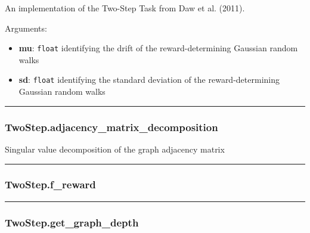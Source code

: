 An implementation of the Two-Step Task from Daw et al. (2011).

Arguments:

\begin{itemize}
\tightlist
\item
  \textbf{mu}: \texttt{float} identifying the drift of the
  reward-determining Gaussian random walks
\item
  \textbf{sd}: \texttt{float} identifying the standard deviation of the
  reward-determining Gaussian random walks
\end{itemize}

\begin{center}\rule{0.5\linewidth}{\linethickness}\end{center}

\subsubsection{TwoStep.adjacency\_matrix\_decomposition}\label{twostep.adjacency_matrix_decomposition}

\begin{Shaded}
\begin{Highlighting}[]
\NormalTok{)}
\end{Highlighting}
\end{Shaded}

Singular value decomposition of the graph adjacency matrix

\begin{center}\rule{0.5\linewidth}{\linethickness}\end{center}

\subsubsection{TwoStep.f\_reward}\label{twostep.f_reward}

\begin{Shaded}
\begin{Highlighting}[]
\end{Highlighting}
\end{Shaded}

\begin{center}\rule{0.5\linewidth}{\linethickness}\end{center}

\subsubsection{TwoStep.get\_graph\_depth}\label{twostep.get_graph_depth}

